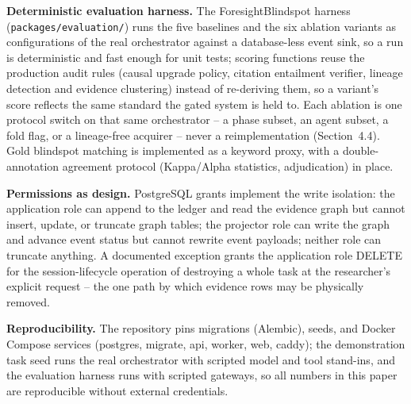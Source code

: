 \textbf{Deterministic evaluation harness.} The ForesightBlindspot harness
(\texttt{packages/evaluation/}) runs the five baselines and the six
ablation variants as configurations of the real orchestrator against a
database-less event sink, so a run is deterministic and fast enough for
unit tests; scoring functions reuse the production audit rules (causal
upgrade policy, citation entailment verifier, lineage detection and
evidence clustering) instead of re-deriving them, so a variant's score
reflects the same standard the gated system is held to. Each ablation is
one protocol switch on that same orchestrator -- a phase subset, an agent
subset, a fold flag, or a lineage-free acquirer -- never a reimplementation
(Section~4.4). Gold blindspot matching is implemented as a keyword
proxy, with a double-annotation agreement protocol (Kappa/Alpha
statistics, adjudication) in place.

\textbf{Permissions as design.} PostgreSQL grants implement the write
isolation: the application role can append to the ledger and read the
evidence graph but cannot insert, update, or truncate graph tables; the
projector role can write the graph and advance event status but cannot
rewrite event payloads; neither role can truncate anything. A documented
exception grants the application role DELETE for the session-lifecycle
operation of destroying a whole task at the researcher's explicit request
-- the one path by which evidence rows may be physically removed.

\textbf{Reproducibility.} The repository pins migrations (Alembic),
seeds, and Docker Compose services (postgres, migrate, api, worker, web,
caddy); the demonstration task seed runs the real orchestrator with
scripted model and tool stand-ins, and the evaluation harness runs with
scripted gateways, so all numbers in this paper are reproducible without
external credentials.
